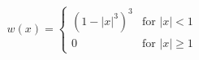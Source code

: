 

\[
w(x) = \left\{ 
\begin{array}{ll}
(1 - |x|^3)^3 & \mbox{for $|x| < 1$}    \\
0             & \mbox{for $|x| \geq 1$}
\end{array}
\right.
\]


